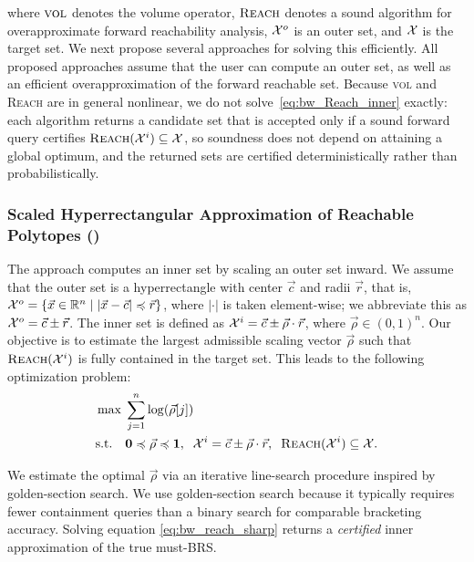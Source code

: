\documentclass[letterpaper, 10 pt, conference]{ieeeconf}  %
\begin{document}
\vspace*{-1em}
\noindent 
where $\textsc{vol}$ denotes the volume operator, $\textsc{Reach}$ denotes a sound algorithm for overapproximate forward reachability analysis, $\mathcal{X}^o$ is an outer set, and $\mathcal{X}$ is the target set. We next propose several approaches for solving this efficiently. All proposed approaches assume that the user can compute an outer set, as well as an efficient overapproximation of the forward reachable set.
Because \textsc{vol} and \textsc{Reach} are in general nonlinear, we do not solve~\eqref{eq:bw_Reach_inner} exactly: each algorithm returns a candidate set that is accepted only if a sound forward query certifies $\textsc{Reach}(\mathcal{X}^i) \subseteq \mathcal{X}$, so soundness does not depend on attaining a global optimum, and the returned sets are certified deterministically rather than probabilistically.
\subsubsection{Scaled Hyperrectangular Approximation of Reachable Polytopes (\ssharp)}
The \ssharp approach computes an inner set by scaling an outer set inward. We assume that the outer set is a hyperrectangle with center $\vec{c}$ and radii $\vec{r}$, that is, $\mathcal{X}^o = \{\vec{x} \in \mathbb{R}^n \mid |\vec{x} - \vec{c}| \preccurlyeq \vec{r}\}$, where $|\cdot|$ is taken element-wise; we abbreviate this as $\mathcal{X}^o = \vec{c} \pm \vec{r}$. The inner set is defined as $\mathcal{X}^i = \vec{c} \pm \vec{\rho} \cdot \vec{r}$, where $\vec{\rho} \in (0,1)^n$. Our objective is to estimate the largest admissible scaling vector $\vec{\rho}$ such that $\textsc{Reach}(\mathcal{X}^i)$ is fully contained in the target set. This leads to the following optimization problem:
\begin{subequations}
\begin{align}
    &\max \; \sum_{j=1}^n \log(\vec{\rho}[j]) \\
    &\text{s.t.} \quad 
      \mathbf{0} \preccurlyeq \vec{\rho} \preccurlyeq \mathbf{1}, \;\;
      \mathcal{X}^i  = \vec{c} \pm \vec{\rho} \cdot \vec{r}, \;\;
      \textsc{Reach}(\mathcal{X}^i) \subseteq \mathcal{\mathcal{X}}.
\end{align}
\label{eq:bw_reach_sharp}
\end{subequations}

\vspace*{-1em}
\noindent
We estimate the optimal $\vec{\rho}$ via an iterative line-search procedure inspired by golden-section search. We use golden-section search because it typically requires fewer containment queries than a binary search for comparable bracketing accuracy. Solving equation \eqref{eq:bw_reach_sharp} returns a \emph{certified} inner approximation of the true must-BRS. 
\end{document}
